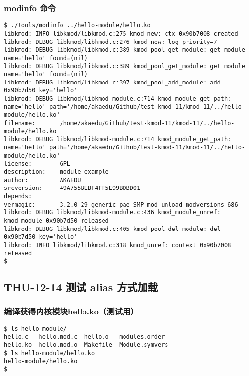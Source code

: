 \documentclass[11pt,a4paper]{article}
\begin{document}
\subsubsection{modinfo 命令}

{\begin{shaded}\begin{verbatim}
$ ./tools/modinfo ../hello-module/hello.ko 
libkmod: INFO libkmod/libkmod.c:275 kmod_new: ctx 0x90b7008 created
libkmod: DEBUG libkmod/libkmod.c:276 kmod_new: log_priority=7
libkmod: DEBUG libkmod/libkmod.c:389 kmod_pool_get_module: get module name='hello' found=(nil)
libkmod: DEBUG libkmod/libkmod.c:389 kmod_pool_get_module: get module name='hello' found=(nil)
libkmod: DEBUG libkmod/libkmod.c:397 kmod_pool_add_module: add 0x90b7d50 key='hello'
libkmod: DEBUG libkmod/libkmod-module.c:714 kmod_module_get_path: name='hello' path='/home/akaedu/Github/test-kmod-11/kmod-11/../hello-module/hello.ko'
filename:       /home/akaedu/Github/test-kmod-11/kmod-11/../hello-module/hello.ko
libkmod: DEBUG libkmod/libkmod-module.c:714 kmod_module_get_path: name='hello' path='/home/akaedu/Github/test-kmod-11/kmod-11/../hello-module/hello.ko'
license:        GPL
description:    module example 
author:         AKAEDU
srcversion:     49A755BEBF4FF5E99BDBD01
depends:        
vermagic:       3.2.0-29-generic-pae SMP mod_unload modversions 686 
libkmod: DEBUG libkmod/libkmod-module.c:436 kmod_module_unref: kmod_module 0x90b7d50 released
libkmod: DEBUG libkmod/libkmod.c:405 kmod_pool_del_module: del 0x90b7d50 key='hello'
libkmod: INFO libkmod/libkmod.c:318 kmod_unref: context 0x90b7008 released
$ 
\end{verbatim}\end{shaded}}
\subsection{THU-12-14 测试 alias 方式加载}

\subsubsection{编译获得内核模块hello.ko（测试用）}

{\begin{shaded}\begin{verbatim}
$ ls hello-module/
hello.c   hello.mod.c  hello.o   modules.order
hello.ko  hello.mod.o  Makefile  Module.symvers
$ ls hello-module/hello.ko 
hello-module/hello.ko
$ 
\end{verbatim}\end{shaded}}
\end{document}
